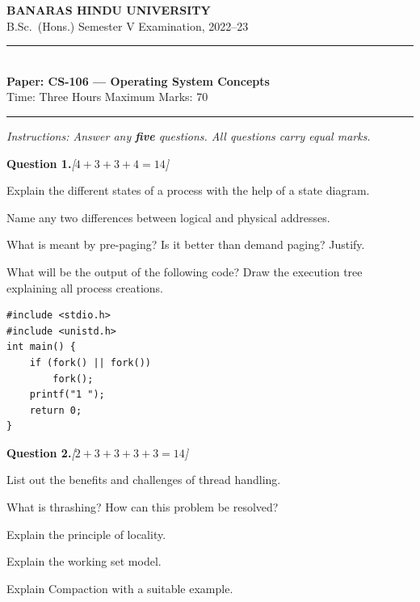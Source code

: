 \documentclass[11pt,a4paper]{article}
\newcommand{\pts}[1]{\hfill   \textit{[#1]}}
\begin{document}
\begin{center}
  {\large\bfseries BANARAS HINDU UNIVERSITY}\\[2pt]
  {
\normalsize B.Sc.\ (Hons.) Semester V Examination, 2022--23}\\[6pt]
  \rule{0.8\linewidth}{0.5pt}\\[6pt]
  {\large\bfseries Paper: CS-106 --- Operating System Concepts}\\[4pt]
  {
\normalsize Time: Three Hours \hfill Maximum Marks: 70}
\end{center}

\rule{\linewidth}{0.4pt}

\smallskip



\noindent   \textit{Instructions: Answer any   \textbf{five} questions. All questions carry equal marks.}

\bigskip




\noindent   \textbf{Question 1.}\pts{$4+3+3+4=14$}

\begin{parts}
  \item Explain the different states of a process with the help of a state diagram.
  \item Name any two differences between logical and physical addresses.
  \item What is meant by pre-paging? Is it better than demand paging? Justify.
  \item What will be the output of the following code? Draw the execution tree explaining all process creations.

\begin{lstlisting}
#include <stdio.h>
#include <unistd.h>
int main() {
    if (fork() || fork())
        fork();
    printf("1 ");
    return 0;
}
\end{lstlisting}
\end{parts}

\bigskip




\noindent   \textbf{Question 2.}\pts{$2+3+3+3+3=14$}

\begin{parts}
  \item List out the benefits and challenges of thread handling.
  \item What is thrashing? How can this problem be resolved?
  \item Explain the principle of locality.
  \item Explain the working set model.
  \item Explain Compaction with a suitable example.
\end{parts}
\end{document}
